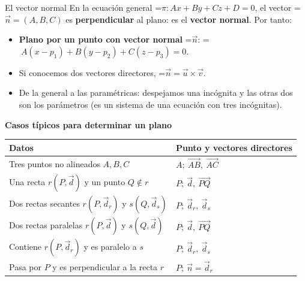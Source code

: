 \documentclass[11pt,a4paper]{article}
\newcommand{\fmm}[1]{\setbox0=\hbox{$#1$}\ifdim\wd0>\linewidth\fmdisp{#1}\else\mbox{\box0}\fi}
\newcommand{\fmdisp}[1]{\[\setbox2=\hbox{$\displaystyle #1$}\ifdim\wd2>\linewidth\resizebox{\linewidth}{!}{\box2}\else\box2\fi\]}
\begin{document}
\begin{fmprop}{El vector normal}
En la ecuación general \fmm{\pi:Ax+By+Cz+D=0}, el vector \fmm{\vec n=(A,B,C)} es \textbf{perpendicular} al plano: es el \textbf{vector normal}. Por tanto:

\begin{itemize}
\item \textbf{Plano por un punto con vector normal} \fmm{\vec n}: \fmm{\ A(x-p_1)+B(y-p_2)+C(z-p_3)=0}.
\item Si conocemos dos vectores directores, \fmm{\vec n=\vec u\times\vec v}.
\item De la general a las paramétricas: despejamos una incógnita y las otras dos son los parámetros (es un sistema de una ecuación con tres incógnitas).
\end{itemize}

\textbf{Casos típicos para determinar un plano}

\begin{center}\renewcommand{\arraystretch}{1.5}\small\begin{tabularx}{\linewidth}{>{\raggedright\arraybackslash}p{7.2cm}>{\raggedright\arraybackslash}X}\toprule
\textbf{Datos} & \textbf{Punto y vectores directores}\\\midrule
Tres puntos no alineados $A,B,C$ & $A;\ \overrightarrow{AB},\ \overrightarrow{AC}$\\[3pt]
Una recta $r(P,\vec d)$ y un punto $Q\notin r$ & $P;\ \vec d,\ \overrightarrow{PQ}$\\[3pt]
Dos rectas secantes $r(P,\vec d_r)$ y $s(Q,\vec d_s)$ & $P;\ \vec d_r,\ \vec d_s$\\[3pt]
Dos rectas paralelas $r(P,\vec d)$ y $s(Q,\vec d)$ & $P;\ \vec d,\ \overrightarrow{PQ}$\\[3pt]
Contiene $r(P,\vec d_r)$ y es paralelo a $s$ & $P;\ \vec d_r,\ \vec d_s$\\[3pt]
Pasa por $P$ y es perpendicular a la recta $r$ & $P;\ \vec n=\vec d_r$\\[3pt]
\bottomrule\end{tabularx}\end{center}
\end{fmprop}
\end{document}
